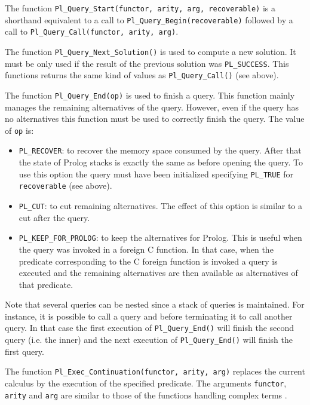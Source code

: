 The function \texttt{Pl\_Query\_Start(functor, arity, arg, recoverable)} is a
shorthand equivalent to a call to \texttt{Pl\_Query\_Begin(recoverable)} followed by
a call to \texttt{Pl\_Query\_Call(functor, arity, arg)}.

The function \texttt{Pl\_Query\_Next\_Solution()} is used to compute a new
solution. It must be only used if the result of the previous solution was
\texttt{PL\_SUCCESS}. This functions returns the same kind of values as
\texttt{Pl\_Query\_Call()} (see above).

The function \texttt{Pl\_Query\_End(op)} is used to finish a query. This
function mainly manages the remaining alternatives of the query. However,
even if the query has no alternatives this function must be used to
correctly finish the query. The value of \texttt{op} is:

\begin{itemize}

\item \texttt{PL\_RECOVER}: to recover the memory space consumed by the
query. After that the state of Prolog stacks is exactly the same as before
opening the query. To use this option the query must have been initialized
specifying \texttt{PL\_TRUE} for \texttt{recoverable} (see above).

\item \texttt{PL\_CUT}: to cut remaining alternatives. The effect of this
option is similar to a cut after the query.

\item \texttt{PL\_KEEP\_FOR\_PROLOG}: to keep the alternatives for Prolog.
This is useful when the query was invoked in a foreign C function. In that
case, when the predicate corresponding to the C foreign function is invoked
a query is executed and the remaining alternatives are then available as
alternatives of that predicate.

\end{itemize}

Note that several queries can be nested since a stack of queries is
maintained. For instance, it is possible to call a query and before
terminating it to call another query. In that case the first execution of
\texttt{Pl\_Query\_End()} will finish the second query (i.e. the inner) and
the next execution of \texttt{Pl\_Query\_End()} will finish the first query.

The function \texttt{Pl\_Exec\_Continuation(functor, arity, arg)}
replaces the current calculus by the execution of the specified
predicate. The arguments \texttt{functor}, \texttt{arity} and \texttt{arg}
are similar to those of the functions handling complex terms
.

